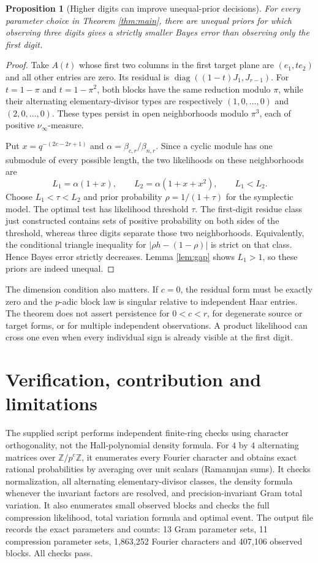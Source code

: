 \documentclass[11pt]{article}
\newtheorem{proposition}[theorem]{Proposition}
\begin{document}
\begin{proposition}[Higher digits can improve unequal-prior decisions]\label{prop:priors}
For every parameter choice in Theorem \ref{thm:main}, there are unequal priors for which observing three digits gives a strictly smaller Bayes error than observing only the first digit.
\end{proposition}
\begin{proof}
Take $A(t)$ whose first two columns in the first target plane are $(e_1,t e_2)$ and all other entries are zero. Its residual is
$\operatorname{diag}((1-t)J_1,J_{r-1})$. For $t=1-\pi$ and $t=1-\pi^2$, both blocks have the same reduction modulo $\pi$, while their alternating elementary-divisor types are respectively $(1,0,\ldots,0)$ and $(2,0,\ldots,0)$. These types persist in open neighborhoods modulo $\pi^3$, each of positive $\nu_\infty$-measure.

Put $x=q^{-(2c-2r+1)}$ and $\alpha=\beta_{c,r}/\beta_{n,r}$. Since a cyclic module has one submodule of every possible length, the two likelihoods on these neighborhoods are
\[
 L_1=\alpha(1+x),\qquad L_2=\alpha(1+x+x^2),\qquad L_1<L_2.
\]
Choose $L_1<\tau<L_2$ and prior probability $\rho=1/(1+\tau)$ for the symplectic model. The optimal test has likelihood threshold $\tau$. The first-digit residue class just constructed contains sets of positive probability on both sides of the threshold, whereas three digits separate those two neighborhoods. Equivalently, the conditional triangle inequality for $|\rho h-(1-\rho)|$ is strict on that class. Hence Bayes error strictly decreases. Lemma \ref{lem:gap} shows $L_1>1$, so these priors are indeed unequal.
\end{proof}

The dimension condition also matters. If $c=0$, the residual form must be exactly zero and the $p$-adic block law is singular relative to independent Haar entries. The theorem does not assert persistence for $0<c<r$, for degenerate source or target forms, or for multiple independent observations. A product likelihood can cross one even when every individual sign is already visible at the first digit.

\section{Verification, contribution and limitations}
The supplied script performs independent finite-ring checks using character orthogonality, not the Hall-polynomial density formula. For $4$ by $4$ alternating matrices over $\mathbb Z/p^e\mathbb Z$, it enumerates every Fourier character and obtains exact rational probabilities by averaging over unit scalars (Ramanujan sums). It checks normalization, all alternating elementary-divisor classes, the density formula whenever the invariant factors are resolved, and precision-invariant Gram total variation. It also enumerates small observed blocks and checks the full compression likelihood, total variation formula and optimal event. The output file records the exact parameters and counts: 13 Gram parameter sets, 11 compression parameter sets, 1,863,252 Fourier characters and 407,106 observed blocks. All checks pass.
\end{document}
